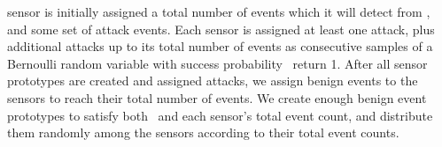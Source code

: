 sensor is initially assigned a total number of events which it will
detect from \numEventProtosDetected, and some set of attack
events. Each sensor is assigned at least one attack, plus
additional attacks up to its total number of events as consecutive
samples of a Bernoulli random variable with success probability
\sensorOverlap\ return 1.  After all sensor prototypes are
created and assigned attacks, we assign benign events to the sensors
to reach their total number of events.
We create enough benign event prototypes to satisfy
both \sensorToBenignRatio\ and each sensor's total event count, and
distribute them randomly among the sensors according to their total
event counts. 

